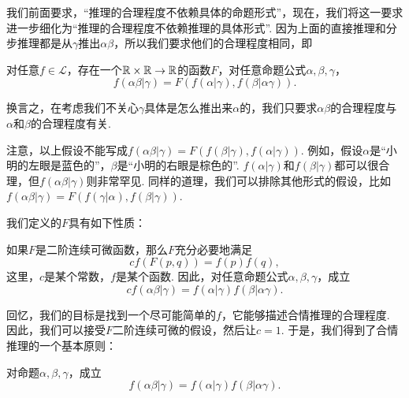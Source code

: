 \begin{center}
\end{center}

我们前面要求，“推理的合理程度不依赖具体的命题形式”，现在，我们将这一要求进一步细化为“推理的合理程度不依赖推理的具体形式”. 因为上面的直接推理和分步推理都是从$\gamma$推出$\alpha\beta$，所以我们要求他们的合理程度相同，即

\begin{hypothesis}
    对任意$f\in\mathcal L$，存在一个$\mathbb{R}\times\mathbb{R}\to\mathbb{R}$的函数$F$，对任意命题公式$\alpha,\beta,\gamma$，
    \[
        f(\alpha\beta|\gamma)=F(f(\alpha|\gamma),f(\beta|\alpha\gamma)).
    \]
\end{hypothesis}

换言之，在考虑我们不关心$\gamma$具体是怎么推出来$\alpha$的，我们只要求$\alpha\beta$的合理程度与$\alpha$和$\beta$的合理程度有关. 

注意，以上假设不能写成$f(\alpha\beta|\gamma) = F(f(\beta|\gamma), f(\alpha|\gamma))$. 例如，假设$\alpha$是“小明的左眼是蓝色的”，$\beta$是“小明的右眼是棕色的”. $f(\alpha|\gamma)$和$f(\beta|\gamma)$都可以很合理，但$f(\alpha\beta|\gamma)$则非常罕见. 同样的道理，我们可以排除其他形式的假设，比如$f(\alpha\beta|\gamma) = F(f(\gamma|\alpha), f(\beta|\gamma))$.

我们定义的$F$具有如下性质：
\begin{theorem}
    如果$F$是二阶连续可微函数，那么$F$充分必要地满足
        \[cf(F(p,q))=f(p)f(q),\]
        这里，$c$是某个常数，$f$是某个函数.
        因此，对任意命题公式$\alpha,\beta,\gamma$，成立
        \[cf(\alpha\beta|\gamma)=f(\alpha|\gamma)f(\beta|\alpha\gamma).\]
    \end{theorem}

回忆，我们的目标是找到一个尽可能简单的$f$，它能够描述合情推理的合理程度. 因此，我们可以接受$F$二阶连续可微的假设，然后让$c=1$. 于是，我们得到了合情推理的一个基本原则：
\begin{principle}[与规则]
对命题$\alpha,\beta,\gamma$，成立
\[f(\alpha\beta|\gamma)=f(\alpha|\gamma)f(\beta|\alpha\gamma).\]
\end{principle}

